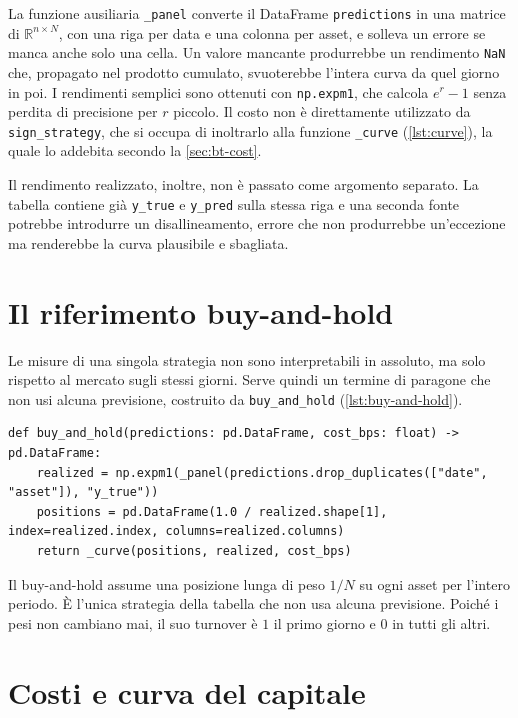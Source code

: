 La funzione ausiliaria \texttt{\_panel} converte il DataFrame \texttt{predictions} in una matrice di $\mathbb{R}^{n\times N}$, con una riga per data e una colonna per asset, e solleva un errore se manca anche solo una cella. Un valore mancante produrrebbe un rendimento \texttt{NaN} che, propagato nel prodotto cumulato, svuoterebbe l'intera curva da quel giorno in poi. I rendimenti semplici sono ottenuti con \texttt{np.expm1}, che calcola $e^r-1$ senza perdita di precisione per $r$ piccolo. Il costo non è direttamente utilizzato da \texttt{sign\_strategy}, che si occupa di inoltrarlo alla funzione \texttt{\_curve} (\cref{lst:curve}), la quale lo addebita secondo la \cref{sec:bt-cost}.

Il rendimento realizzato, inoltre, non è passato come argomento separato. La tabella contiene già \texttt{y\_true} e \texttt{y\_pred} sulla stessa riga e una seconda fonte potrebbe introdurre un disallineamento, errore che non produrrebbe un'eccezione ma renderebbe la curva plausibile e sbagliata.

\section{Il riferimento buy-and-hold}
\label{sec:bt-benchmark}

Le misure di una singola strategia non sono interpretabili in assoluto, ma solo rispetto al mercato sugli stessi giorni. Serve quindi un termine di paragone che non usi alcuna previsione, costruito da \texttt{buy\_and\_hold} (\cref{lst:buy-and-hold}).

\begin{listing}[H]
\begin{verbatim}
def buy_and_hold(predictions: pd.DataFrame, cost_bps: float) -> pd.DataFrame:
    realized = np.expm1(_panel(predictions.drop_duplicates(["date", "asset"]), "y_true"))
    positions = pd.DataFrame(1.0 / realized.shape[1], index=realized.index, columns=realized.columns)
    return _curve(positions, realized, cost_bps)
\end{verbatim}
\caption{\texttt{buy\_and\_hold}}
\label{lst:buy-and-hold}
\end{listing}

Il buy-and-hold assume una posizione lunga di peso $1/N$ su ogni asset per l'intero periodo. È l'unica strategia della tabella che non usa alcuna previsione. Poiché i pesi non cambiano mai, il suo turnover è $1$ il primo giorno e $0$ in tutti gli altri.

\section{Costi e curva del capitale}
\label{sec:bt-costs-and-curve}

